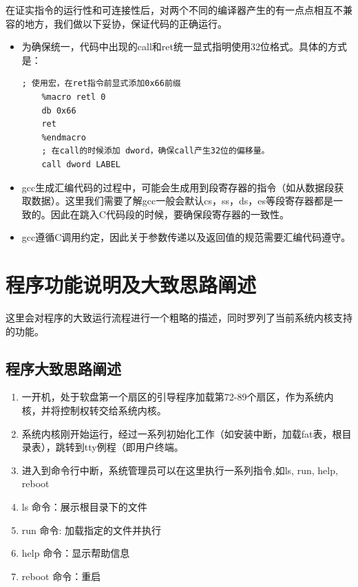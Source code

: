 \documentclass[forprint]{WHUBachelor}
\begin{document}
在证实指令的运行性和可连接性后，对两个不同的编译器产生的有一点点相互不兼容的地方，我们做以下妥协，保证代码的正确运行。

\begin{itemize}
  \item 为确保统一，代码中出现的call和ret统一显式指明使用32位格式。具体的方式是：
  \begin{lstlisting}[language={[x86masm]Assembler}]
    ; 使用宏，在ret指令前显式添加0x66前缀
    %macro retl 0
    db 0x66
    ret
    %endmacro
    ; 在call的时候添加 dword，确保call产生32位的偏移量。
    call dword LABEL
  \end{lstlisting}

  \item gcc生成汇编代码的过程中，可能会生成用到段寄存器的指令（如从数据段获取数据）。这里我们需要了解gcc一般会默认cs，ss，ds，es等段寄存器都是一致的。因此在跳入C代码段的时候，要确保段寄存器的一致性。

  \item gcc遵循C调用约定，因此关于参数传递以及返回值的规范需要汇编代码遵守。
  
\end{itemize}

\section{程序功能说明及大致思路阐述}

这里会对程序的大致运行流程进行一个粗略的描述，同时罗列了当前系统内核支持的功能。

\subsection{程序大致思路阐述}

\begin{enumerate}
  \item 一开机，处于软盘第一个扇区的引导程序加载第72-89个扇区，作为系统内核，并将控制权转交给系统内核。
  \item 系统内核刚开始运行，经过一系列初始化工作（如安装中断，加载fat表，根目录表），跳转到tty例程（即用户终端。
  \item 进入到命令行中断，系统管理员可以在这里执行一系列指令,如ls, run, help, reboot
  \item ls 命令：展示根目录下的文件
  \item run 命令: 加载指定的文件并执行
  \item help 命令：显示帮助信息
  \item reboot 命令：重启
\end{enumerate}
\end{document}
